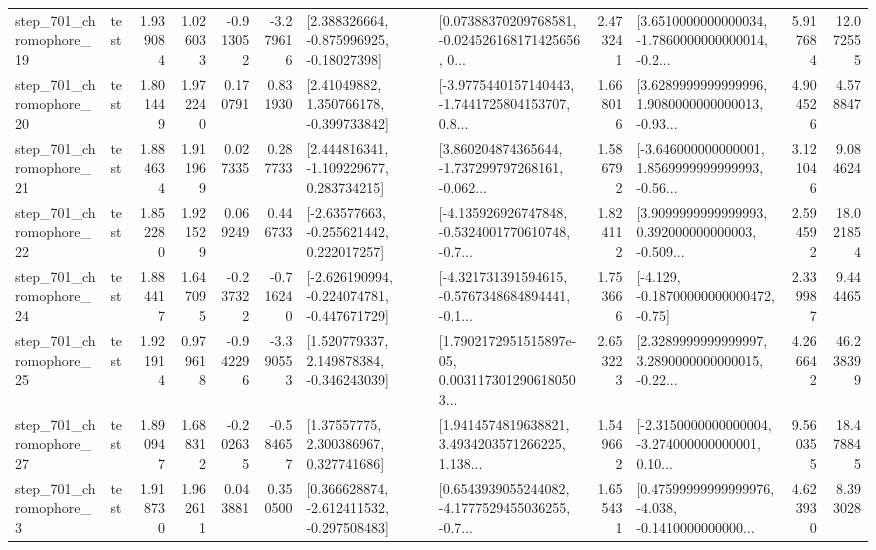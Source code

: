 \begin{tabular}{llrrrrllrlrr}
  step\_701\_chromophore\_19 &      test &      1.939084 &    1.026033 &     -0.913052 & -3.279616 &    [2.388326664, -0.875996925, -0.18027398] &  [0.07388370209768581, -0.024526168171425656, 0... &       2.473241 &  [3.6510000000000034, -1.7860000000000014, -0.2... &            5.917684 &         12.072555 \\
  step\_701\_chromophore\_20 &      test &      1.801449 &    1.972240 &      0.170791 &  0.831930 &     [2.41049882, 1.350766178, -0.399733842] &  [-3.9775440157140443, -1.7441725804153707, 0.8... &       1.668016 &  [3.6289999999999996, 1.9080000000000013, -0.93... &            4.904526 &          4.578847 \\
  step\_701\_chromophore\_21 &      test &      1.884634 &    1.911969 &      0.027335 &  0.287733 &    [2.444816341, -1.109229677, 0.283734215] &  [3.860204874365644, -1.737299797268161, -0.062... &       1.586792 &  [-3.646000000000001, 1.8569999999999993, -0.56... &            3.121046 &          9.084624 \\
  step\_701\_chromophore\_22 &      test &      1.852280 &    1.921529 &      0.069249 &  0.446733 &    [-2.63577663, -0.255621442, 0.222017257] &  [-4.135926926747848, -0.5324001770610748, -0.7... &       1.824112 &  [3.9099999999999993, 0.392000000000003, -0.509... &            2.594592 &         18.021854 \\
  step\_701\_chromophore\_24 &      test &      1.884417 &    1.647095 &     -0.237322 & -0.716240 &  [-2.626190994, -0.224074781, -0.447671729] &  [-4.321731391594615, -0.5767348684894441, -0.1... &       1.753666 &              [-4.129, -0.18700000000000472, -0.75] &            2.339987 &          9.444465 \\
  step\_701\_chromophore\_25 &      test &      1.921914 &    0.979618 &     -0.942296 & -3.390553 &    [1.520779337, 2.149878384, -0.346243039] &  [1.7902172951515897e-05, 0.0031173012906180503... &       2.653223 &  [2.3289999999999997, 3.2890000000000015, -0.22... &            4.266642 &         46.238399 \\
  step\_701\_chromophore\_27 &      test &      1.890947 &    1.688312 &     -0.202635 & -0.584657 &      [1.37557775, 2.300386967, 0.327741686] &  [1.9414574819638821, 3.4934203571266225, 1.138... &       1.549662 &  [-2.3150000000000004, -3.274000000000001, 0.10... &            9.560355 &         18.478845 \\
   step\_701\_chromophore\_3 &      test &      1.918730 &    1.962611 &      0.043881 &  0.350500 &   [0.366628874, -2.612411532, -0.297508483] &  [0.6543939055244082, -4.1777529455036255, -0.7... &       1.655431 &  [0.47599999999999976, -4.038, -0.1410000000000... &            4.623930 &          8.393028 \\

\end{tabular}
